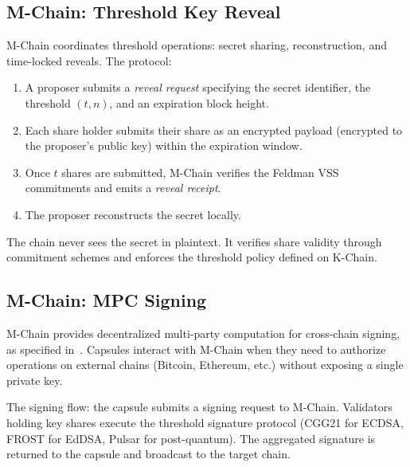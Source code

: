 \subsection{M-Chain: Threshold Key Reveal}\label{sec:tchain}

M-Chain coordinates threshold operations: secret sharing, reconstruction, and
time-locked reveals. The protocol:

\begin{enumerate}[nosep]
  \item A proposer submits a \textit{reveal request} specifying the secret
        identifier, the threshold $(t, n)$, and an expiration block height.
  \item Each share holder submits their share as an encrypted payload
        (encrypted to the proposer's public key) within the expiration window.
  \item Once $t$ shares are submitted, M-Chain verifies the Feldman VSS
        commitments and emits a \textit{reveal receipt}.
  \item The proposer reconstructs the secret locally.
\end{enumerate}

The chain never sees the secret in plaintext. It verifies share validity
through commitment schemes and enforces the threshold policy defined on K-Chain.

\subsection{M-Chain: MPC Signing}\label{sec:mchain}

M-Chain provides decentralized multi-party computation for cross-chain signing,
as specified in~\cite{lux-mchain-mpc}. Capsules interact with M-Chain when they
need to authorize operations on external chains (Bitcoin, Ethereum, etc.) without
exposing a single private key.

The signing flow: the capsule submits a signing request to M-Chain. Validators
holding key shares execute the threshold signature protocol (CGG21 for ECDSA,
FROST for EdDSA, Pulsar for post-quantum). The aggregated signature is
returned to the capsule and broadcast to the target chain.

